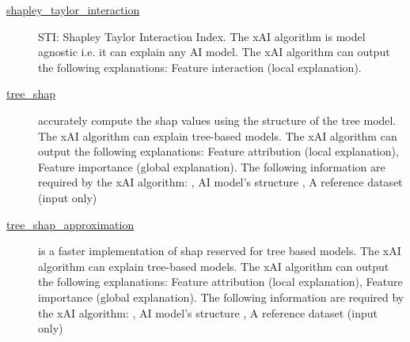 \begin{description}
\item[\href{https://github.com/Karim-53/Compare-xAI/blob/main/explainers/shapley_taylor_interaction.py}{shapley\_taylor\_interaction}] 
 \citep{sundararajan2020shapley} 
STI: Shapley Taylor Interaction Index. 
The xAI algorithm is model agnostic i.e. it can explain any AI model. 
The xAI algorithm can output the following explanations: Feature interaction (local explanation). 


\item[\href{https://github.com/Karim-53/Compare-xAI/blob/main/explainers/shap_explainer.py}{tree\_shap}] 
 \citep{lundberg2018consistent} 
accurately compute the shap values using the structure of the tree model. 
The xAI algorithm can explain tree-based models. 
The xAI algorithm can output the following explanations: Feature attribution (local explanation), Feature importance (global explanation). 
The following information are required by the xAI algorithm: 
			 , AI model's structure
			 , A reference dataset (input only)

\item[\href{https://github.com/Karim-53/Compare-xAI/blob/main/explainers/shap_explainer.py}{tree\_shap\_approximation}] 
 
is a faster implementation of shap reserved for tree based models. 
The xAI algorithm can explain tree-based models. 
The xAI algorithm can output the following explanations: Feature attribution (local explanation), Feature importance (global explanation). 
The following information are required by the xAI algorithm: 
			 , AI model's structure
			 , A reference dataset (input only)

\end{description}